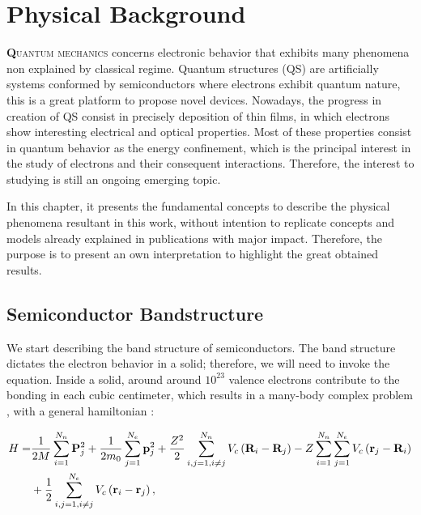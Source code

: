 \chapter{Physical Background }
\label{This chapter bears the basis of fundamental physics in semiconductors and
quantum structures that were implemented to understand the results in this work..}
\vfill
\minitoc
\newpage

\lettrine[lines=3, lraise=.1, nindent=0mm, slope=0mm]{\textbf{Q}}{uantum mechanics}  concerns electronic behavior that exhibits many phenomena non explained by classical regime. Quantum structures (QS) are artificially systems conformed by semiconductors where electrons exhibit quantum nature, this is a great platform to propose novel devices. Nowadays, the progress in creation of QS consist in precisely deposition of thin films, in which electrons show interesting electrical and optical properties\cite{sundram1991structures}. Most of these properties consist in quantum behavior  as the energy confinement, which is the principal interest in the study of electrons and their consequent interactions. Therefore, the interest to studying is still an ongoing emerging topic. 

In this chapter, it presents the fundamental concepts to describe the physical  phenomena resultant in this work, without intention to replicate concepts and models already explained in publications with major impact. Therefore, the purpose is to present an own interpretation to highlight the great obtained results.

\section{Semiconductor Bandstructure}
\label{sec:chapter-1-semiconductor}
\vspace{-10mm}
We start describing the band structure of semiconductors. The band structure dictates the electron behavior in a solid; therefore, we will need to invoke the \sch equation. Inside a solid, around around $10^{23}$ valence electrons contribute to the bonding in each cubic centimeter,  which results in a many-body complex problem \cite{piprek2017handbook}, with a general hamiltonian \cite{alloul2010introduction,cardona2005fundamentals}: 

\begin{equation}
\begin{split}
	H  =  &\dfrac{1}{2M}\sum\limits_{i=1}^{N_{n}} \mathrm{\bf P}_{j}^{2} + \dfrac{1}{2m_{0}} \sum\limits_{j=1}^{N_{e}} \mathrm{\bf p}_{j}^{2} + \dfrac{Z^{2}}{2} \sum\limits_{i,j=1,i\neq j}^{N_{n}} V_{c}\left(\mathrm{\bf R}_{i}-\mathrm{\bf R}_{j}\right)-Z\sum\limits_{i=1}^{N_{n}}\sum\limits_{j=1}^{N_{e}}V_{c}\left(\mathrm{\bf r}_{j}-\mathrm{\bf R}_{i}\right) \\
	   & + \dfrac{1}{2} \sum\limits_{i,j=1,i\neq j}^{N_{e}} V_{c} \left(\mathrm{\bf r}_{i}-\mathrm{\bf r}_{j}\right),
\end{split}
\label{eq:chapter-1-solid-hamiltonian}
\end{equation}

